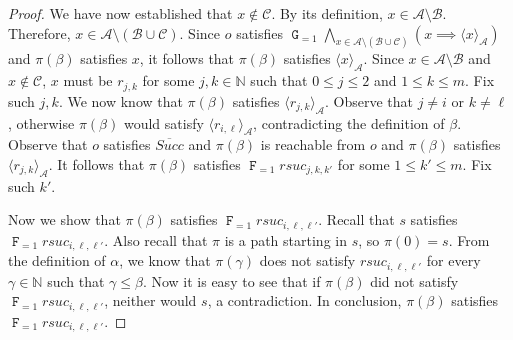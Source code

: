 \documentclass[a4paper,UKenglish,cleveref, autoref, thm-restate]{lipics-v2021}
\newcommand{\A}{\mathcal{A}}
\newcommand{\B}{\mathcal{B}}
\newcommand{\ex}[1]{\langle #1 \rangle}
\newcommand{\Succ}{\mathit{Succ}}
\newcommand*{\opf}{\operatorname{\pmb{\mathtt{F}}}}
\newcommand*{\opg}{\operatorname{\pmb{\mathtt{G}}}}
\newcommand*{\nat}{\mathbb{N}}
\begin{document}
\begin{proof}
We have now established that $x \not \in \mathcal{C}$.
By its definition, $x \in \A \setminus \B$.
Therefore, $x \in \A \setminus (\B \cup \mathcal{C})$.
Since $o$ satisfies $\opg_{=1} \bigwedge_{x \in \A \setminus (\B \cup \mathcal{C})} \left( x \implies \ex{x}_{\A} \right)$ and $\pi(\beta)$ satisfies $x$,
it follows that $\pi(\beta)$ satisfies $\ex{x}_{\A}$.
Since $x \in \A \setminus \B$ and $x \not \in \mathcal{C}$,
$x$ must be $r_{j,k}$ for some $j,k \in \nat$ such that
$0 \leq j \leq 2$ and $1 \leq k \leq m$.
Fix such $j,k$.
We now know that $\pi(\beta)$ satisfies $\ex{r_{j,k}}_{\A}$.
Observe that $j \neq i$ or $k \neq \ell$,
otherwise $\pi(\beta)$ would satisfy $\ex{r_{i,\ell}}_{\A}$,
contradicting the definition of $\beta$.
Observe that $o$ satisfies $\overline{\Succ}$ and $\pi(\beta)$
is reachable from $o$ and $\pi(\beta)$ satisfies $\ex{r_{j,k}}_{\A}$.
It follows that $\pi(\beta)$ satisfies $\opf_{=1} rsuc_{j,k,k'}$ for some $1 \leq k' \leq m$.
Fix such $k'$.



Now we show that $\pi(\beta)$ satisfies
$\opf_{=1} rsuc_{i,\ell,\ell'}$.
Recall that $s$ satisfies $\opf_{=1} rsuc_{i,\ell,\ell'}$.
Also recall that $\pi$ is a path starting in $s$, so $\pi(0) = s$.
From the definition of $\alpha$, we know that $\pi(\gamma)$ does not
satisfy $rsuc_{i,\ell,\ell'}$ for every $\gamma \in \nat$ such
that $\gamma \leq \beta$.
Now it is easy to see that if $\pi(\beta)$ did not satisfy
$\opf_{=1} rsuc_{i,\ell,\ell'}$, neither would $s$, a contradiction.
In conclusion, $\pi(\beta)$ satisfies $\opf_{=1} rsuc_{i,\ell,\ell'}$.




\end{proof}
\end{document}
